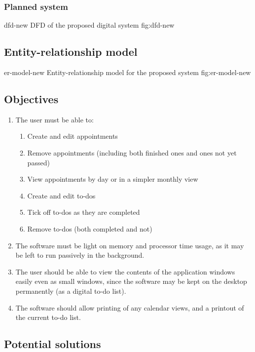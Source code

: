 \subsubsection{Planned system}

\addfigure
    {dfd-new}
    {DFD of the proposed digital system}
    {fig:dfd-new}


\subsection{Entity-relationship model}

\addfigure
    {er-model-new}
    {Entity-relationship model for the proposed system}
    {fig:er-model-new}


\subsection{Objectives}

\begin{enumerate}
    \item The user must be able to:
    \begin{enumerate}
        \item Create and edit appointments
        \item Remove appointments (including both finished ones and ones not yet
            passed)
        \item View appointments by day or in a simpler monthly view
        \item Create and edit to-dos
        \item Tick off to-dos as they are completed
        \item Remove to-dos (both completed and not)
    \end{enumerate}
    \item The software must be light on memory and processor time usage, as it
        may be left to run passively in the background.
    \item The user should be able to view the contents of the application
        windows easily even as small windows, since the software may be kept
        on the desktop permanently (as a digital to-do list).
    \item The software should allow printing of any calendar views, and a
        printout of the current to-do list.
\end{enumerate}


\subsection{Potential solutions}

